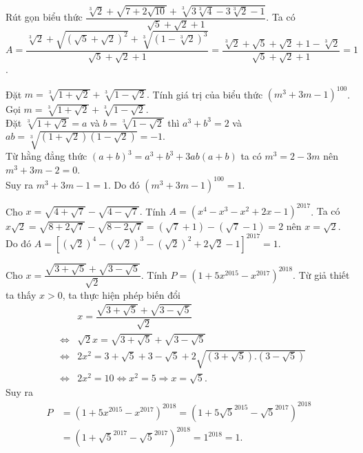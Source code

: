 \begin{bt}%
	Rút gọn biểu thức $\dfrac{\sqrt[3]{2}+\sqrt{7+2\sqrt{10}}+\sqrt[3]{3\sqrt[3]{4}-3\sqrt[3]{2}-1}}{\sqrt{5}+\sqrt{2}+1}$.
	\loigiai
	{
		Ta có $A=\dfrac{\sqrt[3]{2}+\sqrt{\left(\sqrt{5}+\sqrt{2}\right)^2}+ \sqrt[3]{\left(1-\sqrt[3]{2}\right)^3}}{\sqrt{5}+\sqrt{2}+1} =\dfrac{\sqrt[3]{2}+\sqrt{5}+\sqrt{2}+1 -\sqrt[3]{2}}{\sqrt{5}+\sqrt{2}+1}=1$.
	}
\end{bt}

\begin{bt}
	Đặt $m=\sqrt[3]{1+\sqrt{2}}+\sqrt[3]{1-\sqrt{2}}.$ Tính giá trị của biểu thức $\left(m^3+3m-1\right)^{100}$.
	\loigiai
	{
		Gọi $m=\sqrt[3]{1+\sqrt{2}}+\sqrt[3]{1-\sqrt{2}}.$\\
		Đặt $\sqrt[3]{1+\sqrt{2}}=a$ và $b=\sqrt[3]{1-\sqrt{2}}$ thì $a^3+b^3=2$ và $ab=\sqrt[3]{\left(1+\sqrt{2}\right)\left(1-\sqrt{2}\right)}=-1$.\\
		Từ hằng đẳng thức $(a+b)^3=a^3+b^3+3ab(a+b)$ ta có $m^3=2-3m$ nên $m^3+3m-2=0$.\\
		Suy ra $m^3+3m-1=1$. Do đó $(m^3+3m-1)^{100}=1.$
	}
\end{bt}

\begin{bt}%
	Cho $x=\sqrt{4+\sqrt{7}}- \sqrt{4-\sqrt{7}}.$ Tính $A=\left( x^4-x^3-x^2+2x-1\right)^{2017}$.
	\loigiai
	{
		Ta có $x\sqrt{2} = \sqrt{8+2\sqrt{7}} - \sqrt{8-2\sqrt{7}} = (\sqrt{7}+1) -(\sqrt{7}-1)=2$ nên $x=\sqrt{2}$.\\
		Do đó $A=\left[(\sqrt{2})^4-(\sqrt{2})^3-(\sqrt{2})^2+2\sqrt{2}-1\right]^{2017}=1$.
	}
\end{bt}

\begin{bt}%
	Cho $x=\dfrac{\sqrt{3+\sqrt{5}}+\sqrt{3-\sqrt{5}}}{\sqrt{2}}$. Tính $P=\left(1+5x^{2015}-x^{2017}\right)^{2018}$.
	\loigiai
	{
		Từ giả thiết ta thấy $x>0$, ta thực hiện phép biến đổi
		\allowdisplaybreaks
		\begin{eqnarray*}
			& & x=\dfrac{\sqrt{3+\sqrt{5}}+\sqrt{3-\sqrt{5}}}{\sqrt{2}}\\
			&\Leftrightarrow & \sqrt{2}x=\sqrt{3+\sqrt{5}}+\sqrt{3-\sqrt{5}}\\
			&\Leftrightarrow & 2x^2=3+\sqrt{5}+3-\sqrt{5}+2\sqrt{\left(3+\sqrt{5}\right).\left(3-\sqrt{5}\right)}\\
			&\Leftrightarrow & 2x^2=10\Leftrightarrow x^2=5\Rightarrow x=\sqrt{5}.
		\end{eqnarray*}
		Suy ra
		\begin{align*}
		P&=\left(1+5x^{2015}-x^{2017}\right)^{2018}=\left(1+5\sqrt{5}^{2015}-\sqrt{5}^{2017}\right)^{2018}\\
		&=\left(1+\sqrt{5}^{2017}-\sqrt{5}^{2017}\right)^{2018}=1^{2018}=1.
		\end{align*}
	}
\end{bt}


